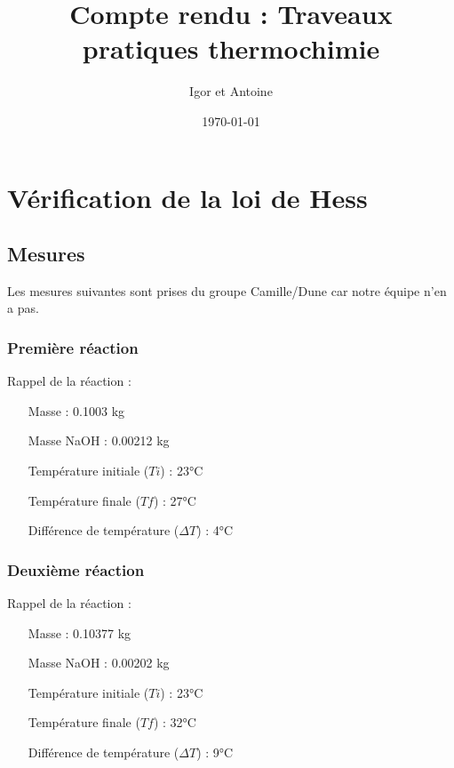 \documentclass[a4paper, 12pt]{article}
\author{Igor et Antoine}
\date{\today}
\title{Compte rendu : Traveaux pratiques thermochimie}
\begin{document}
\maketitle
\tableofcontents
\section{Vérification de la loi de Hess}
\subsection{Mesures}
Les mesures suivantes sont prises du groupe Camille/Dune car notre équipe n'en
a pas.
\subsubsection{Première réaction}
Rappel de la réaction : 
\begin{center}
\end{center}

\begin{itemize}
    \item[Masse \ce{H_2O} : ] 0.1003 kg
    \item[Masse NaOH : ] 0.00212 kg
    \item[Température initiale \ce{H_2O} ($Ti$) :] 23°C  
    \item[Température finale ($Tf$) :] 27°C  
    \item[Différence de température ($\Delta T$) :] 4°C  
\end{itemize}

\subsubsection{Deuxième réaction}
Rappel de la réaction : 
\begin{center}
\end{center}

\begin{itemize}
    \item[Masse \ce{H_2O} : ] 0.10377 kg
    \item[Masse NaOH : ] 0.00202 kg
    \item[Température initiale \ce{HCl} ($Ti$) :] 23°C 
    \item[Température finale ($Tf$) :] 32°C  
    \item[Différence de température ($\Delta T$) :] 9°C  
\end{itemize}
\end{document}
